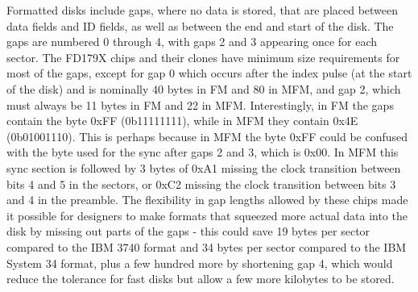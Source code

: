 \documentclass[a4paper]{article}
\begin{document}
Formatted disks include gaps, where no data is stored, that are placed
between data fields and ID fields, as well as between the end and
start of the disk. The gaps are numbered 0 through 4, with gaps 2 and
3 appearing once for each sector. The FD179X chips and their clones
have minimum size requirements for most of the gaps, except for gap 0
which occurs after the index pulse (at the start of the disk) and is
nominally 40 bytes in FM and 80 in MFM, and gap 2, which must always
be 11 bytes in FM and 22 in MFM. Interestingly, in FM the gaps contain
the byte 0xFF (0b11111111), while in MFM they contain 0x4E
(0b01001110). This is perhaps because in MFM the byte 0xFF could be
confused with the byte used for the sync after gaps 2 and 3, which is
0x00. In MFM this sync section is followed by 3 bytes of 0xA1 missing
the clock transition between bits 4 and 5 in the sectors, or 0xC2
missing the clock transition between bits 3 and 4 in the preamble. The
flexibility in gap lengths allowed by these chips made it possible for
designers to make formats that squeezed more actual data into the disk
by missing out parts of the gaps - this could save 19 bytes per sector
compared to the IBM 3740 format and 34 bytes per sector compared to
the IBM System 34 format, plus a few hundred more by shortening gap 4,
which would reduce the tolerance for fast disks but allow a few more
kilobytes to be stored.
\end{document}
